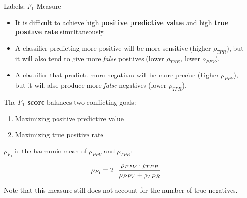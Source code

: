 \documentclass[11pt,compress,t,notes=noshow, xcolor=table]{beamer}
\begin{document}

\begin{vbframe}{Labels: $F_1$ Measure}

\small

\begin{itemize}
  \item It is difficult to achieve high \textbf{positive predictive value} and 
  high \textbf{true positive rate} simultaneously.
   \item A classifier predicting more positive will be more 
   sensitive (higher $\rho_{TPR}$), but it will also tend to give more 
   \textit{false} positives (lower $\rho_{TNR}$, lower $\rho_{PPV}$).
   \item A classifier that predicts more negatives will be more precise 
   (higher $\rho_{PPV}$), but it will also produce more \textit{false} negatives 
   (lower $\rho_{TPR}$).
 \end{itemize}

The \textbf{$F_1$ score} balances two conflicting goals:\\%
\begin{enumerate}
 \item Maximizing positive predictive value
 \item Maximizing true positive rate \\%
\end{enumerate}

$\rho_{F_1}$ is the harmonic mean of $\rho_{PPV}$ and $\rho_{TPR}$:
$$\rho_{F_1} = 2 \cdot \cfrac{\rho_{PPV} \cdot \rho_{TPR}}{\rho_{PPV} + 
\rho_{TPR}}$$

Note that this measure still does not account for the number of true
negatives.

\framebreak

\normalsize


\end{vbframe}
\end{document}
